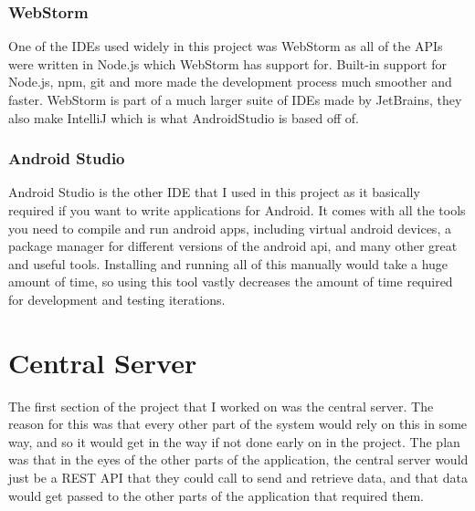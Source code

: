 \subsubsection*{WebStorm}
One of the IDEs used widely in this project was WebStorm as all of the APIs were written in Node.js which WebStorm has support for. Built-in support for Node.js, npm, git and more made the development process much smoother and faster. WebStorm is part of a much larger suite of IDEs made by JetBrains, they also make IntelliJ which is what AndroidStudio is based off of.

\subsubsection*{Android Studio}
Android Studio is the other IDE that I used in this project as it basically required if you want to write applications for Android. It comes with all the tools you need to compile and run android apps, including virtual android devices, a package manager for different versions of the android api, and many other great and useful tools. Installing and running all of this manually would take a huge amount of time, so using this tool vastly decreases the amount of time required for development and testing iterations.

\section{Central Server}
The first section of the project that I worked on was the central server. The reason for this was that every other part of the system would rely on this in some way, and so it would get in the way if not done early on in the project. The plan was that in the eyes of the other parts of the application, the central server would just be a REST API that they could call to send and retrieve data, and that data would get passed to the other parts of the application that required them.



